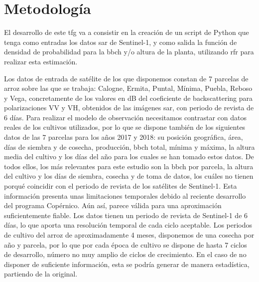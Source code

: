 
\chapter{Metodología}
\label{metodologia}
\par El desarrollo de este \gls{tfg} va a consistir en la creación de un script de Python que tenga como entradas los datos \gls{sar} de Sentinel-1, y como salida la función de densidad de probabilidad para la \gls{bbch} y/o altura de la planta, utilizando \gls{rfr} para realizar esta estimación. 
\\
\par Los datos de entrada de satélite de los que disponemos constan de 7 parcelas de arroz sobre las que se trabaja: Calogne, Ermita, Puntal, Mínima, Puebla, Reboso y Vega, concretamente de los valores en dB del coeficiente de backscattering para polarizaciones VV y VH, obtenidos de las imágenes \gls{sar}, con periodo de revista de 6 días. Para realizar el modelo de observación necesitamos contrastar con datos reales de los cultivos utilizados, por lo que se dispone también de los siguientes datos de las 7 parcelas para los años 2017 y 2018: su posición geográfica, área, días de siembra y de cosecha, producción, \gls{bbch} total, mínima y máxima, la altura media del cultivo y los días del año para los cuales se han tomado estos datos. De todos ellos, los más relevantes para este estudio son la \gls{bbch} por parcela, la altura del cultivo y los días de siembra, cosecha y de toma de datos, los cuáles no tienen porqué coincidir con el periodo de revista de los satélites de Sentinel-1. Esta información presenta unas limitaciones temporales debido al reciente desarrollo del programa Copérnico. Aún así, parece válida para una aproximación suficientemente fiable. Los datos tienen un periodo de revista de Sentinel-1 de 6 días, lo que aporta una resolución temporal de cada ciclo aceptable. Los periodos de cultivo del arroz de aproximadamente 4 meses, disponemos de una cosecha por año y parcela, por lo que por cada época de cultivo se dispone de hasta 7 ciclos de desarrollo, número no muy amplio de ciclos de crecimiento. En el caso de no disponer de suficiente información, esta se podría generar de manera estadística, partiendo de la original. 
